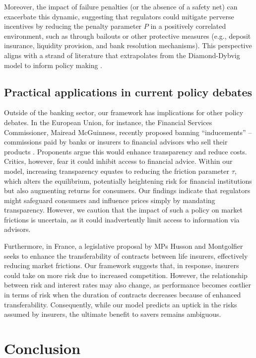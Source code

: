 \documentclass[preprint,12pt,authoryear]{elsarticle}
\theoremstyle{definition}
\begin{document}
Moreover, the impact of failure penalties (or the absence of a safety net) can exacerbate this dynamic, suggesting that regulators could mitigate perverse incentives by reducing the penalty parameter $P$ in a positively correlated environment, such as through bailouts or other protective measures (e.g., deposit insurance, liquidity provision, and bank resolution mechanisms). This perspective aligns with a strand of literature that extrapolates from the Diamond-Dybvig model to inform policy making \citep{bhattacharya1985preference,ennis2009bank}.

\subsection{Practical applications in current policy debates}

Outside of the banking sector, our framework has implications for other policy debates. In the European Union, for instance, the Financial Services Commissioner, Mairead McGuinness, recently proposed banning ``inducements'' – commissions paid by banks or insurers to financial advisors who sell their products \citep{Jones2023}. Proponents argue this would enhance transparency and reduce costs. Critics, however, fear it could inhibit access to financial advice. Within our model, increasing transparency equates to reducing the friction parameter $\tau$, which alters the equilibrium, potentially heightening risk for financial institutions but also augmenting returns for consumers. Our findings indicate that regulators might safeguard consumers and influence prices simply by mandating transparency. However, we caution that the impact of such a policy on market frictions is uncertain, as it could inadvertently limit access to information via advisors.

Furthermore, in France, a legislative proposal by MPs Husson and Montgolfier \citep{senat2023} seeks to enhance the transferability of contracts between life insurers, effectively reducing market frictions. Our framework suggests that, in response, insurers could take on more risk due to increased competition. However, the relationship between risk and interest rates may also change, as performance becomes costlier in terms of risk when the duration of contracts decreases because of enhanced transferability. Consequently, while our model predicts an uptick in the risks assumed by insurers, the ultimate benefit to savers remains ambiguous.


\section{Conclusion}
\end{document}
